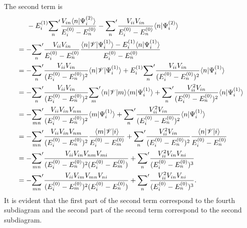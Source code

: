 \documentclass[a4paper]{book}
\newcounter{solution}[chapter]
\begin{document}
\begin{solution}
	The second term is
	\begin{align*}
		&\hspace{1.4em}- E^{(1)}_i { \sum_n }^\prime \frac{ V_{in} \langle n | \Psi^{(2)}_i \rangle }{ E^{(0)}_i - E^{(0)}_n } - { \sum_n }^\prime \frac{ V_{ii} V_{in} }{ E^{(0)}_i - E^{(0)}_n } \langle n | \Psi^{(2)}_i \rangle \\
		&= - { \sum_n }^\prime \frac{ V_{ii} V_{in} }{ E^{(0)}_i - E^{(0)}_n } \frac{ \langle n | \mathscr{V} | \Psi^{(1)}_i \rangle - E^{(1)}_i \langle n | \Psi^{(1)}_i \rangle }{ E^{(0)}_i - E^{(0)}_n } \\
		&= - { \sum_n }^\prime \frac{ V_{ii} V_{in} }{ ( E^{(0)}_i - E^{(0)}_n )^2 } \langle n | \mathscr{V} | \Psi^{(1)}_i \rangle + E^{(1)}_i { \sum_n }^\prime \frac{ V_{ii} V_{in} }{ ( E^{(0)}_i - E^{(0)}_n )^2 } \langle n | \Psi^{(1)}_i \rangle \\
		&= - { \sum_n }^\prime \frac{ V_{ii} V_{in} }{ ( E^{(0)}_i - E^{(0)}_n )^2 } { \sum_m }^\prime \langle n | \mathscr{V} | m \rangle \langle m | \Psi^{(1)}_i \rangle + { \sum_n }^\prime \frac{ V^2_{ii} V_{in} }{ ( E^{(0)}_i - E^{(0)}_n )^2 } \langle n | \Psi^{(1)}_i \rangle \\
		&= - { \sum_{mn} }^\prime \frac{ V_{ii} V_{in} V_{nm} }{ ( E^{(0)}_i - E^{(0)}_n )^2 } \langle m | \Psi^{(1)}_i \rangle + { \sum_n }^\prime \frac{ V^2_{ii} V_{in} }{ ( E^{(0)}_i - E^{(0)}_n )^2 } \langle n | \Psi^{(1)}_i \rangle \\
		&= - { \sum_{mn} }^\prime \frac{ V_{ii} V_{in} V_{nm} }{ ( E^{(0)}_i - E^{(0)}_n )^2 } \frac{ \langle m | \mathscr{V} | i \rangle }{ E^{(0)}_i - E^{(0)}_m } + { \sum_n }^\prime \frac{ V^2_{ii} V_{in} }{ ( E^{(0)}_i - E^{(0)}_n )^2 } \frac{ \langle n | \mathscr{V} | i \rangle }{ E^{(0)}_i - E^{(0)}_n } \\
		&= - { \sum_{mn} }^\prime \frac{ V_{ii} V_{in} V_{nm} V_{mi} }{ ( E^{(0)}_i - E^{(0)}_n )^2 (E^{(0)}_i - E^{(0)}_m) } + { \sum_n }^\prime \frac{ V^2_{ii} V_{in} V_{ni} }{ ( E^{(0)}_i - E^{(0)}_n )^3 } \\
		&= - { \sum_{mn} }^\prime \frac{ V_{ii} V_{im} V_{mn} V_{ni} }{ ( E^{(0)}_i - E^{(0)}_m )^2 ( E^{(0)}_i - E^{(0)}_n ) } + { \sum_n }^\prime \frac{ V^2_{ii} V_{in} V_{ni} }{ ( E^{(0)}_i - E^{(0)}_n )^3 } .
	\end{align*}
	It is evident that the first part of the second term correspond to the fourth subdiagram and the second part of the second term correspond to the second subdiagram.
	

\end{solution}
\end{document}

